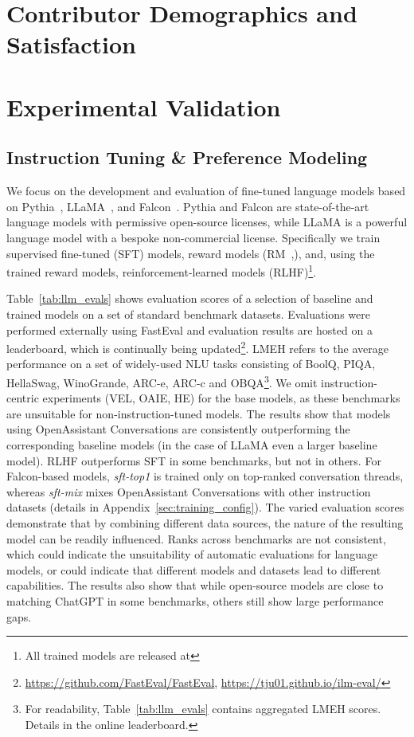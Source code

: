 \section{Contributor Demographics and Satisfaction}
\label{sec:demographics}

\section{Experimental Validation}

\subsection{Instruction Tuning \& Preference Modeling}
\label{sec:instruction_tuning}

We focus on the development and evaluation of fine-tuned language models based on Pythia~\cite{biderman2023pythia}, LLaMA~\cite{touvron2023llama}, and Falcon~\cite{falcon40b}. Pythia and Falcon are state-of-the-art language models with permissive open-source licenses, while LLaMA is a powerful language model with a bespoke non-commercial license. Specifically we train supervised fine-tuned (SFT) models, reward models (RM~\cite{ouyang2022training},\cite{askell2021general}), and, using the trained reward models, reinforcement-learned models (RLHF)\footnote{All trained models are released at \hforg}.

Table~\ref{tab:llm_evals} shows evaluation scores of a selection of baseline and trained models on a set of standard benchmark datasets. Evaluations were performed externally using FastEval and evaluation results are hosted on a leaderboard, which is continually being updated\footnote{\url{https://github.com/FastEval/FastEval}, \url{https://tju01.github.io/ilm-eval/}}.
LMEH refers to the average performance on a set of widely-used NLU tasks consisting of BoolQ, PIQA, HellaSwag, WinoGrande, ARC-e, ARC-c and OBQA\footnote{For readability, Table~\ref{tab:llm_evals} contains aggregated LMEH scores. Details in the online leaderboard.}. We omit instruction-centric experiments (VEL, OAIE, HE) for the base models, as these benchmarks are unsuitable for non-instruction-tuned models. The results show that models using OpenAssistant Conversations are consistently outperforming the corresponding baseline models (in the case of LLaMA even a larger baseline model). RLHF outperforms SFT in some benchmarks, but not in others. For Falcon-based models, \textit{sft-top1} is trained only on top-ranked conversation threads, whereas \textit{sft-mix} mixes OpenAssistant Conversations with other instruction datasets (details in Appendix~\ref{sec:training_config}).
The varied evaluation scores demonstrate that by combining different data sources, the nature of the resulting model can be readily influenced. Ranks across benchmarks are not consistent, which could indicate the unsuitability of automatic evaluations for language models, or could indicate that different models and datasets lead to different capabilities. The results also show that while open-source models are close to matching ChatGPT in some benchmarks, others still show large performance gaps.

